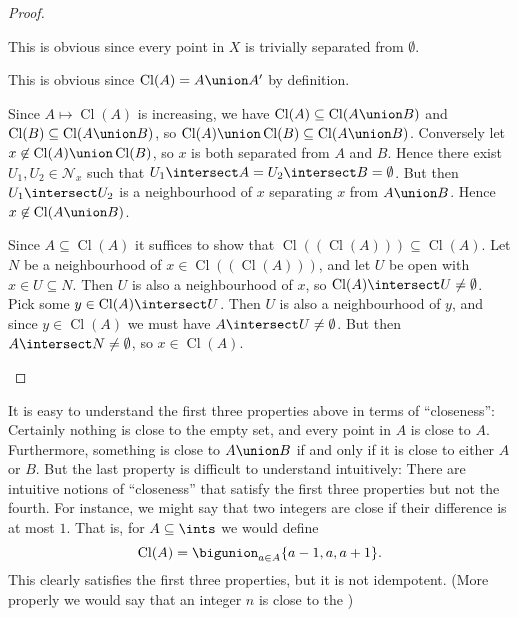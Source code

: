 \documentclass[article, a4paper, 11pt, oneside]{memoir}
\numberwithin{equation}{chapter}
\newcommand{\calN}{\mathcal{N}}
\newcommand{\nhoods}[1]{\calN_{#1}}
\renewcommand{\closure}[1]{\operatorname{Cl}(#1)}
\begin{document}
\begin{proof}
\begin{proofsec}
    \item[Proof of (i)]
    This is obvious since every point in $X$ is trivially separated from $\emptyset$.

    \item[Proof of (ii)]
    This is obvious since $\closure{A} = A \union A'$ by definition.

    \item[Proof of (iii)]
    Since $A \mapsto \closure{A}$ is increasing, we have $\closure{A} \subseteq \closure{A \union B}$ and $\closure{B} \subseteq \closure{A \union B}$, so $\closure{A} \union \closure{B} \subseteq \closure{A \union B}$. Conversely let $x \not\in \closure{A} \union \closure{B}$, so $x$ is both separated from $A$ and $B$. Hence there exist $U_1,U_2 \in \nhoods{x}$ such that $U_1 \intersect A = U_2 \intersect B = \emptyset$. But then $U_1 \intersect U_2$ is a neighbourhood of $x$ separating $x$ from $A \union B$. Hence $x \not\in \closure{A \union B}$.

    \item[Proof of (iv)]
    Since $A \subseteq \closure{A}$ it suffices to show that $\closure{(\closure{A})} \subseteq \closure{A}$. Let $N$ be a neighbourhood of $x \in \closure{(\closure{A})}$, and let $U$ be open with $x \in U \subseteq N$. Then $U$ is also a neighbourhood of $x$, so $\closure{A} \intersect U \neq \emptyset$. Pick some $y \in \closure{A} \intersect U$. Then $U$ is also a neighbourhood of $y$, and since $y \in \closure{A}$ we must have $A \intersect U \neq \emptyset$. But then $A \intersect N \neq \emptyset$, so $x \in \closure{A}$.
\end{proofsec}
\end{proof}

It is easy to understand the first three properties above in terms of \enquote{closeness}: Certainly nothing is close to the empty set, and every point in $A$ is close to $A$. Furthermore, something is close to $A \union B$ if and only if it is close to either $A$ or $B$. But the last property is difficult to understand intuitively: There are intuitive notions of \enquote{closeness} that satisfy the first three properties but not the fourth. For instance, we might say that two integers are close if their difference is at most $1$. That is, for $A \subseteq \ints$ we would define
%
\begin{equation*}
    \closure{A}
        = \bigunion_{a \in A} \{a-1, a, a+1\}.
\end{equation*}
%
This clearly satisfies the first three properties, but it is not idempotent. (More properly we would say that an integer $n$ is close to the )
\end{document}

